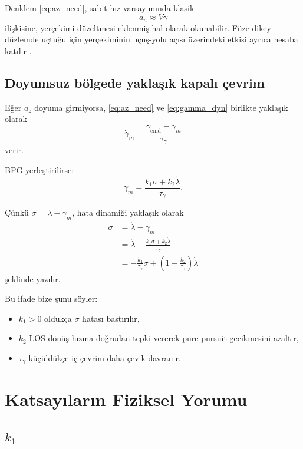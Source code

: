 \documentclass[11pt,a4paper]{article}
\begin{document}
Denklem \eqref{eq:az_need}, sabit hız varsayımında klasik
\begin{equation}
a_n \approx V \dot{\gamma}
\end{equation}
ilişkisine, yerçekimi düzeltmesi eklenmiş hal olarak okunabilir. Füze dikey düzlemde uçtuğu için yerçekiminin uçuş-yolu açısı üzerindeki etkisi ayrıca hesaba katılır \cite{jackson2010fcs}.

\subsection{Doyumsuz bölgede yaklaşık kapalı çevrim}

Eğer \(a_z\) doyuma girmiyorsa, \eqref{eq:az_need} ve \eqref{eq:gamma_dyn} birlikte yaklaşık olarak
\begin{equation}
\dot{\gamma}_m
=
\frac{\gamma_{\mathrm{cmd}}-\gamma_m}{\tau_\gamma}
\end{equation}
verir.

BPG yerleştirilirse:
\begin{equation}
\dot{\gamma}_m
=
\frac{k_1\sigma + k_2\dot{\lambda}}{\tau_\gamma}.
\label{eq:gammadot_cl}
\end{equation}

Çünkü \(\sigma = \lambda - \gamma_m\), hata dinamiği yaklaşık olarak
\begin{align}
\dot{\sigma}
&=
\dot{\lambda} - \dot{\gamma}_m \\
&=
\dot{\lambda}
-
\frac{k_1\sigma + k_2\dot{\lambda}}{\tau_\gamma} \\
&=
-\frac{k_1}{\tau_\gamma}\sigma
+
\left(1-\frac{k_2}{\tau_\gamma}\right)\dot{\lambda}
\label{eq:sigma_dyn}
\end{align}
şeklinde yazılır.

Bu ifade bize şunu söyler:
\begin{itemize}[leftmargin=1.2cm]
  \item \(k_1 > 0\) oldukça \(\sigma\) hatası bastırılır,
  \item \(k_2\) LOS dönüş hızına doğrudan tepki vererek pure pursuit gecikmesini azaltır,
  \item \(\tau_\gamma\) küçüldükçe iç çevrim daha çevik davranır.
\end{itemize}

\section{Katsayıların Fiziksel Yorumu}

\subsection{\texorpdfstring{\(k_1\)}{k1}}
\end{document}
